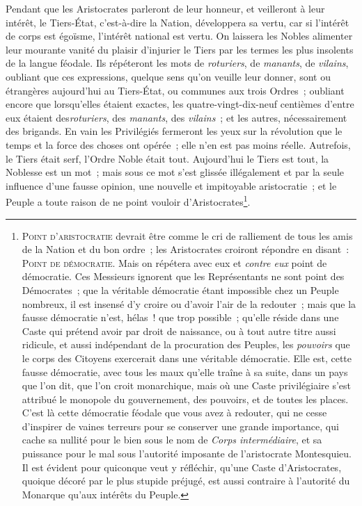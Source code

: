 \documentclass[french,twoside]{book} %
\begin{document}
Pendant que les Aristocrates parleront de leur honneur, et veilleront à leur intérêt, le Tiers-État, c’est-à-dire la Nation, développera sa vertu, car si l’intérêt de corps est égoïsme, l’intérêt national est vertu. On laissera les Nobles alimenter leur mourante vanité du plaisir d’injurier le Tiers par les termes les plus insolents de la langue féodale. Ils répéteront les mots de {\itshape roturiers}, de {\itshape manants}, de {\itshape vilains}, oubliant que ces expressions, quelque sens qu’on veuille leur donner, sont ou étrangères aujourd’hui au Tiers-État, ou communes aux trois Ordres ; oubliant encore que lorsqu’elles étaient exactes, les quatre-vingt-dix-neuf centièmes d’entre eux étaient des{\itshape  roturiers}, des {\itshape manants}, des {\itshape vilains} ; et les autres, nécessairement des brigands. En vain les Privilégiés fermeront les yeux sur la révolution que le temps et la force des choses ont opérée ; elle n’en est pas moins réelle. Autrefois, le Tiers était serf, l’Ordre Noble était tout. Aujourd’hui le Tiers est tout, la Noblesse est un mot ; mais sous ce mot s’est glissée illégalement et par la seule influence d’une fausse opinion, une nouvelle et impitoyable aristocratie ; et le Peuple a toute raison de ne point vouloir d’Aristocrates\footnote{{\scshape Point d’aristocratie} devrait être comme le cri de ralliement de tous les amis de la Nation et du bon ordre ; les Aristocrates croiront répondre en disant : {\scshape Point de démocratie}. Mais on répétera avec eux et {\itshape contre eux} point de démocratie. Ces Messieurs ignorent que les Représentants ne sont point des Démocrates ; que la véritable démocratie étant impossible chez un Peuple nombreux, il est insensé d’y croire ou d’avoir l’air de la redouter ; mais que la fausse démocratie n’est, hélas ! que trop possible ; qu’elle réside dans une Caste qui prétend avoir par droit de naissance, ou à tout autre titre aussi ridicule, et aussi indépendant de la procuration des Peuples, les {\itshape pouvoirs} que le corps des Citoyens exercerait dans une véritable démocratie. Elle est, cette fausse démocratie, avec tous les maux qu’elle traîne à sa suite, dans un pays que l’on dit, que l’on croit monarchique, mais où une Caste privilégiaire s’est attribué le monopole du gouvernement, des pouvoirs, et de toutes les places. C’est là cette démocratie féodale que vous avez à redouter, qui ne cesse d’inspirer de vaines terreurs pour se conserver une grande importance, qui cache sa nullité pour le bien sous le nom de {\itshape Corps intermédiaire}, et sa puissance pour le mal sous l’autorité imposante de l’aristocrate Montesquieu. Il est évident pour quiconque veut y réfléchir, qu’une Caste d’Aristocrates, quoique décoré par le plus stupide préjugé, est aussi contraire à l’autorité du Monarque qu’aux intérêts du Peuple.}.\par
\end{document}
